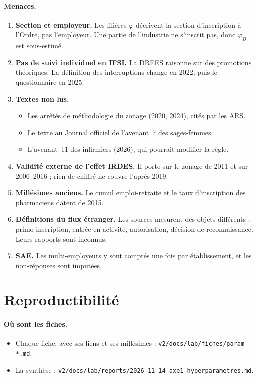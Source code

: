 \documentclass[11pt]{article}
\begin{document}
\paragraph{Menaces.}
\begin{enumerate}
\item \textbf{Section et employeur.} Les filières $\varphi$ décrivent la
  section d'inscription à l'Ordre, pas l'employeur. Une partie de
  l'industrie ne s'inscrit pas, donc $\varphi_B$ est sous-estimé.
\item \textbf{Pas de suivi individuel en IFSI.} La DREES raisonne sur des
  promotions théoriques. La définition des interruptions change en 2022,
  puis le questionnaire en 2025.
\item \textbf{Textes non lus.}
  \begin{itemize}
  \item Les arrêtés de méthodologie du zonage (2020, 2024), cités par les
    ARS.
  \item Le texte au Journal officiel de l'avenant~7 des sages-femmes.
  \item L'avenant~11 des infirmiers (2026), qui pourrait modifier la règle.
  \end{itemize}
\item \textbf{Validité externe de l'effet IRDES.} Il porte sur le zonage de
  2011 et sur 2006--2016 ; rien de chiffré ne couvre l'après-2019.
\item \textbf{Millésimes anciens.} Le cumul emploi-retraite et le taux
  d'inscription des pharmaciens datent de 2015.
\item \textbf{Définitions du flux étranger.} Les sources mesurent des
  objets différents : primo-inscription, entrée en activité, autorisation,
  décision de reconnaissance. Leurs rapports sont inconnus.
\item \textbf{SAE.} Les multi-employeurs y sont comptés une fois par
  établissement, et les non-réponses sont imputées.
\end{enumerate}

\section{Reproductibilité}

\paragraph{Où sont les fiches.}
\begin{itemize}
\item Chaque fiche, avec ses liens et ses millésimes :
  \texttt{v2/docs/lab/fiches/param-*.md}.
\item La synthèse :
  \texttt{v2/docs/lab/reports/2026-11-14-axe1-hyperparametres.md}.
\end{itemize}
\end{document}
